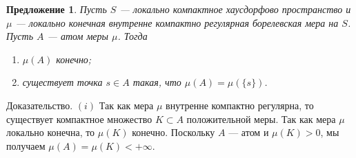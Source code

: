 \documentclass[12pt]{article}
\numberwithin{equation}{subsection}
\theoremstyle{plain}
\newtheorem{proposition}{Предложение}
\newenvironment{proof}{Доказательство.}{}
\begin{document}
\begin{fulltext}
    \begin{proposition}\label{MeasAtomCharac} Пусть $S$ --- локально компактное
        хаусдорфово пространство и $\mu$ --- локально конечная внутренне
        компактно регулярная борелевская мера на $S$. Пусть $A$ --- атом меры
        $\mu$. Тогда

        \begin{enumerate}[label = (\roman*)]
            \item $\mu(A)$ конечно;

            \item существует точка $s\in A$ такая, что $\mu(A)=\mu(\{s\})$.
        \end{enumerate}
    \end{proposition}
    \begin{proof} $(i)$ Так как мера $\mu$ внутренне компактно регулярна, то
        существует компактное множество $K\subset A$ положительной меры. Так как
        мера $\mu$ локально конечна, то $\mu(K)$ конечно. Поскольку $A$ --- атом
        и $\mu(K)>0$, мы получаем $\mu(A)=\mu(K)<+\infty$.


\end{proof}
\end{fulltext}
\end{document}
